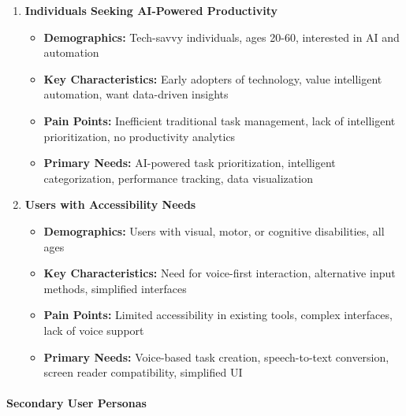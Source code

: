 \documentclass[12pt,a4paper]{article}
\begin{document}
\begin{enumerate}
    \item \textbf{Individuals Seeking AI-Powered Productivity}
    \begin{itemize}
        \item \textbf{Demographics:} Tech-savvy individuals, ages 20-60, interested in AI and automation
        \item \textbf{Key Characteristics:} Early adopters of technology, value intelligent automation, want data-driven insights
        \item \textbf{Pain Points:} Inefficient traditional task management, lack of intelligent prioritization, no productivity analytics
        \item \textbf{Primary Needs:} AI-powered task prioritization, intelligent categorization, performance tracking, data visualization
    \end{itemize}
    
    \item \textbf{Users with Accessibility Needs}
    \begin{itemize}
        \item \textbf{Demographics:} Users with visual, motor, or cognitive disabilities, all ages
        \item \textbf{Key Characteristics:} Need for voice-first interaction, alternative input methods, simplified interfaces
        \item \textbf{Pain Points:} Limited accessibility in existing tools, complex interfaces, lack of voice support
        \item \textbf{Primary Needs:} Voice-based task creation, speech-to-text conversion, screen reader compatibility, simplified UI
    \end{itemize}
\end{enumerate}

\paragraph{Secondary User Personas}
\end{document}
